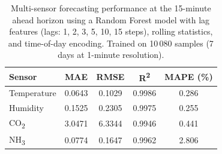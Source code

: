 \begin{table}[htbp]
  \centering
  \caption{Multi-sensor forecasting performance at the 15-minute ahead horizon using a
           Random Forest model with lag features (lags: 1, 2, 3, 5, 10, 15 steps),
           rolling statistics, and time-of-day encoding. Trained on 10\,080 samples
           (7 days at 1-minute resolution).}
  \label{tab:ai_forecasting_15min}
  \begin{tabular}{lcccc}
    \hline
    \textbf{Sensor} & \textbf{MAE} & \textbf{RMSE} &
    \textbf{R\textsuperscript{2}} & \textbf{MAPE (\%)} \\
    \hline
  Temperature & 0.0643 & 0.1029 & 0.9986 & 0.286 \\
  Humidity & 0.1525 & 0.2305 & 0.9975 & 0.255 \\
  CO\textsubscript{2} & 3.0471 & 6.3344 & 0.9946 & 0.441 \\
  NH\textsubscript{3} & 0.0774 & 0.1647 & 0.9962 & 2.806 \\
    \hline
  \end{tabular}
\end{table}
